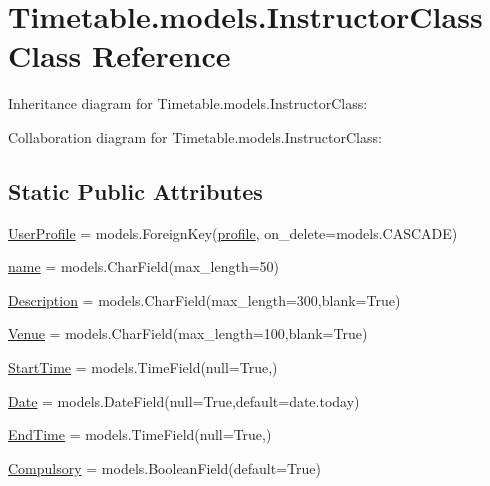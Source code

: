 \hypertarget{classTimetable_1_1models_1_1InstructorClass}{}\section{Timetable.\+models.\+Instructor\+Class Class Reference}
\label{classTimetable_1_1models_1_1InstructorClass}


Inheritance diagram for Timetable.\+models.\+Instructor\+Class\+:


Collaboration diagram for Timetable.\+models.\+Instructor\+Class\+:
\subsection*{Static Public Attributes}
\begin{DoxyCompactItemize}
\item 
\hyperlink{classTimetable_1_1models_1_1InstructorClass_aa2e79111de73e0c8624aca6754ca3da4}{User\+Profile} = models.\+Foreign\+Key(\hyperlink{classprofiles_1_1models_1_1profile}{profile}, on\+\_\+delete=models.\+C\+A\+S\+C\+A\+DE)
\item 
\hyperlink{classTimetable_1_1models_1_1InstructorClass_a215826a11f8c099d0691884b0c045b8d}{name} = models.\+Char\+Field(max\+\_\+length=50)
\item 
\hyperlink{classTimetable_1_1models_1_1InstructorClass_af05fb9cc69b52a27e26adc4a26c1631b}{Description} = models.\+Char\+Field(max\+\_\+length=300,blank=True)
\item 
\hyperlink{classTimetable_1_1models_1_1InstructorClass_a87d254b4d0a0b634824d3ac69920ec2d}{Venue} = models.\+Char\+Field(max\+\_\+length=100,blank=True)
\item 
\hyperlink{classTimetable_1_1models_1_1InstructorClass_ae84d6848e4563e2174fa59dde0349497}{Start\+Time} = models.\+Time\+Field(null=True,)
\item 
\hyperlink{classTimetable_1_1models_1_1InstructorClass_a93d7f8dc40544f71ef1b9ead30fe03c5}{Date} = models.\+Date\+Field(null=True,default=date.\+today)
\item 
\hyperlink{classTimetable_1_1models_1_1InstructorClass_a6007f8134ba154b5ef244c98f1aa0fdf}{End\+Time} = models.\+Time\+Field(null=True,)
\item 
\hyperlink{classTimetable_1_1models_1_1InstructorClass_aaf8aedb5f2f9eb793d8596f4c208c654}{Compulsory} = models.\+Boolean\+Field(default=True)
\end{DoxyCompactItemize}


